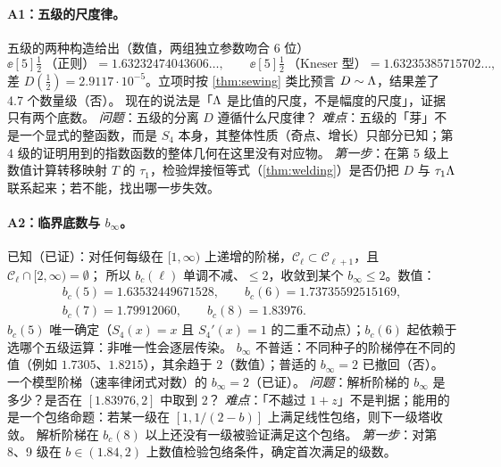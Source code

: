 \paragraph{A1：五级的尺度律。}五级的两种构造给出（数值，两组独立参数吻合 6 位）
\[
  \ee[5]\tfrac12\ \text{（正则）}=1.63232474043606\ldots,\qquad
  \ee[5]\tfrac12\ \text{（Kneser 型）}=1.63235385715702\ldots,
\]
差 $D(\tfrac12)=2.9117\cdot10^{-5}$。立项时按 \cref{thm:sewing} 类比预言 $D\sim\Lambda$，结果差了 4.7 个数量级（否）。
现在的说法是「$\Lambda$ 是比值的尺度，不是幅度的尺度」，证据只有两个底数。
\emph{问题}：五级的分离 $D$ 遵循什么尺度律？
\emph{难点}：五级的「芽」不是一个显式的整函数，而是 $S_4$ 本身，其整体性质（奇点、增长）只部分已知；第 4 级的证明用到的指数函数的整体几何在这里没有对应物。
\emph{第一步}：在第 5 级上数值计算转移映射 $T$ 的 $\tau_1$，检验焊接恒等式（\cref{thm:welding}）是否仍把 $D$ 与 $\tau_1\Lambda$ 联系起来；若不能，找出哪一步失效。

\paragraph{A2：临界底数与 $b_\infty$。}已知（已证）：对任何每级在 $[1,\infty)$ 上递增的阶梯，$\mathcal C_\ell\subset\mathcal C_{\ell+1}$，且 $\mathcal C_\ell\cap[2,\infty)=\emptyset$；
所以 $b_c(\ell)$ 单调不减、$\le2$，收敛到某个 $b_\infty\le2$。数值：
\[
\begin{gathered}
  b_c(5)=1.63532449671528,\qquad b_c(6)=1.73735592515169,\\
  b_c(7)=1.79912060,\qquad b_c(8)=1.83976 .
\end{gathered}
\]
$b_c(5)$ 唯一确定（$S_4(x)=x$ 且 $S_4'(x)=1$ 的二重不动点）；$b_c(6)$ 起依赖于选哪个五级运算：非唯一性会逐层传染。
$b_\infty$ 不普适：不同种子的阶梯停在不同的值（例如 $1.7305$、$1.8215$），其余趋于 $2$（数值）；普适的 $b_\infty=2$ 已撤回（否）。
一个模型阶梯（速率律闭式对数）的 $b_\infty=2$（已证）。
\emph{问题}：解析阶梯的 $b_\infty$ 是多少？是否在 $[1.83976,2]$ 中取到 $2$？
\emph{难点}：「不越过 $1+z$」不是判据；能用的是一个包络命题：若某一级在 $[1,1/(2-b)]$ 上满足线性包络，则下一级塔收敛。
解析阶梯在 $b_c(8)$ 以上还没有一级被验证满足这个包络。
\emph{第一步}：对第 8、9 级在 $b\in(1.84,2)$ 上数值检验包络条件，确定首次满足的级数。


